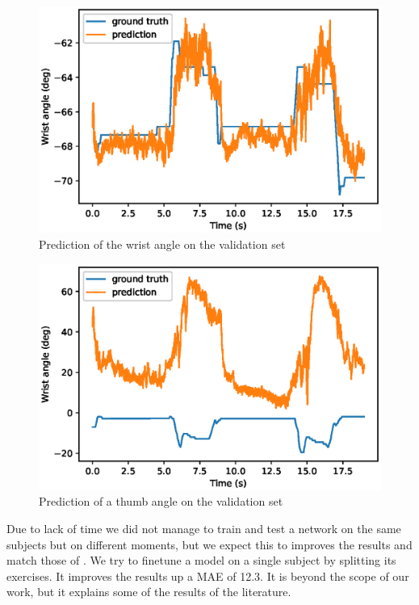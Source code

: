 \documentclass[final]{cvpr}
\begin{document}
\begin{figure}[t]
	\begin{center}
		\includegraphics[width=0.95\linewidth]{wrist}
	\end{center}
	\caption{Prediction of the wrist angle on the validation set}
	\label{wrist}
\end{figure}

\begin{figure}[t]
	\begin{center}
		\includegraphics[width=0.95\linewidth]{foire.eps}
	\end{center}
	\caption{Prediction of a thumb angle on the validation set}
	\label{foire}
\end{figure}

Due to lack of time we did not manage to train and test a network on the same subjects but on different moments, but we expect this to improves the results and match those of \cite{Koch}. We try to finetune a model on a single subject by splitting its exercises. It improves the results up a MAE of 12.3. It is beyond the scope of our work, but it explains some of the results of the literature. 
\end{document}
